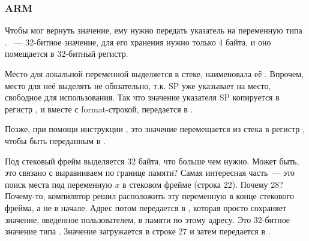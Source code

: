 \subsubsection{ARM}

\myparagraph{\OptimizingKeilVI (\ThumbMode)}



\myindex{\CLanguageElements!\Pointers}
Чтобы \scanf мог вернуть значение, ему нужно передать указатель на переменную типа \Tint.
\Tint~--- 32-битное значение, для его хранения нужно только 4 байта, и оно помещается в 32-битный регистр.

Место для локальной переменной  выделяется в стеке, \IDA наименовала её . 
Впрочем, место для неё выделять не обязательно, т.к.  \ac{SP} уже указывает на место, 
свободное для использования.
Так что значение указателя \ac{SP} копируется в регистр , и вместе с format-строкой, 
передается в \scanf.

Позже, при помощи инструкции , это значение перемещается из стека в регистр , чтобы быть переданным в \printf.




Под стековый фрейм выделяется 32 байта, что больше чем нужно. Может быть, это связано с выравниваем по границе памяти?
Самая интересная часть~--- это поиск места под переменную $x$ в стековом фрейме (строка 22).
Почему 28? Почему-то, компилятор решил расположить эту переменную в конце стекового фрейма, а не в начале.
Адрес потом передается в \scanf, которая просто сохраняет значение, введенное пользователем, в памяти по этому адресу.
Это 32-битное значение типа \Tint.
Значение загружается в строке 27 и затем передается в \printf.


